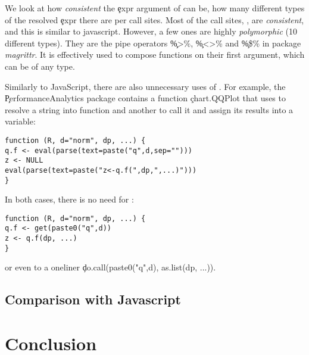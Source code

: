 \documentclass[USenglish,cleveref, autoref, thm-restate]{lipics-v2019}
\begin{document}
We look at how \emph{consistent} the \c{expr} argument of \eval can
be, \ie how many different types of the resolved \c{expr} there are
per call sites. Most of the call sites, \ie \PercentMonomorphic, are
\emph{consistent}, and this is similar to javascript. However, a few
ones are highly \emph{polymorphic} (10 different types). They are the
pipe operators \c{\%>\%}, \c{\%<>\%} and \c{\%\$\%} in package
\emph{magrittr}. It is effectively used to compose functions on their
first argument, which can be of any type.

Similarly to JavaScript, there are also unnecessary uses of \eval. For
example, the \c{PerformanceAnalytics} package contains a function
\c{chart.QQPlot} that uses \eval to resolve a string into function and
another to call it and assign its results into a variable:
\begin{lstlisting}
function (R, d="norm", dp, ...) {
q.f <- eval(parse(text=paste("q",d,sep="")))
z <- NULL
eval(parse(text=paste("z<-q.f(",dp,",...)")))
}
\end{lstlisting}
  In both cases, there is no need for \eval:
\begin{lstlisting}
function (R, d="norm", dp, ...) {
q.f <- get(paste0("q",d))
z <- q.f(dp, ...)
}
\end{lstlisting}
  or even to a oneliner \c{do.call(paste0("q",d), as.list(dp, ...))}.

\subsection{Comparison with Javascript}



\section{Conclusion}




\end{document}
